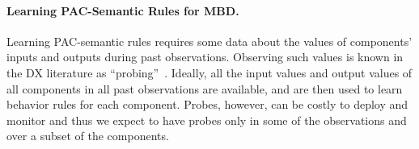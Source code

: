 \documentclass[12pt]{article}
\begin{document}



\paragraph{Learning PAC-Semantic Rules for MBD.}
Learning PAC-semantic rules requires some data about the values of components' inputs and outputs 
during past observations. Observing such values is known in the DX literature as ``probing''~\cite{deKleer1987diagnosing,rish2004real,feldman2010model}. 
Ideally, all the input values and output values of all components in all past observations are available, 
and are then used to learn behavior rules for each component. 
Probes, however, can be costly to deploy and monitor and thus we expect to have probes only in some of the observations and over a subset of the components. 
\end{document}
